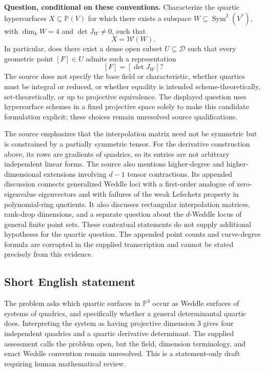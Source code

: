 \documentclass[11pt]{article}
\newcommand{\PP}{\mathbb{P}}
\begin{document}
\textbf{Question, conditional on these conventions.} Characterize the quartic hypersurfaces \(X\subseteq\PP(V)\) for which there exists a subspace \(W\subseteq\operatorname{Sym}^2(V^*)\), with \(\dim_k W=4\) and \(\det J_W\ne0\), such that
\[
X=\mathcal W(W).
\]
In particular, does there exist a dense open subset \(U\subseteq\mathcal D\) such that every geometric point \([F]\in U\) admits such a representation
\[
[F]=[\det J_W]?
\]
The source does not specify the base field or characteristic, whether quartics must be integral or reduced, or whether equality is intended scheme-theoretically, set-theoretically, or up to projective equivalence. The displayed question uses hypersurface schemes in a fixed projective space solely to make this candidate formulation explicit; these choices remain unresolved source qualifications.

The source emphasizes that the interpolation matrix need not be symmetric but is constrained by a partially symmetric tensor. For the derivative construction above, its rows are gradients of quadrics, so its entries are not arbitrary independent linear forms. The source also mentions higher-degree and higher-dimensional extensions involving \(d-1\) tensor contractions. Its appended discussion connects generalized Weddle loci with a first-order analogue of zero-eigenvalue eigenvectors and with failures of the weak Lefschetz property in polynomial-ring quotients. It also discusses rectangular interpolation matrices, rank-drop dimensions, and a separate question about the \(d\)-Weddle locus of general finite point sets. These contextual statements do not supply additional hypotheses for the quartic question. The appended point counts and curve-degree formula are corrupted in the supplied transcription and cannot be stated precisely from this evidence.
\subsection{Short English statement}
The problem asks which quartic surfaces in \(\PP^3\) occur as Weddle surfaces of systems of quadrics, and specifically whether a general determinantal quartic does. Interpreting the system as having projective dimension \(3\) gives four independent quadrics and a quartic derivative determinant. The supplied assessment calls the problem open, but the field, dimension terminology, and exact Weddle convention remain unresolved. This is a statement-only draft requiring human mathematical review.
\end{document}
